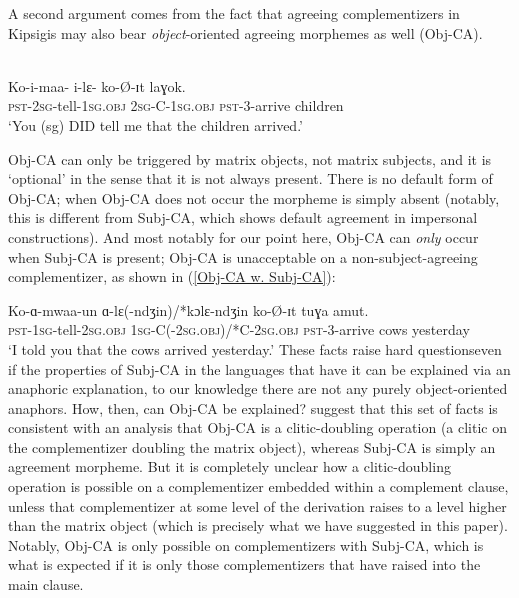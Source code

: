 \documentclass[output=paper
,modfonts
,nonflat
]{langsci/langscibook}
\begin{document}
A second argument comes from the fact that agreeing complementizers in Kipsigis may also bear \textit{object}-oriented agreeing morphemes as well (Obj-CA). 

\ea \label{ObjCAExample} 
\\
\gll Ko-i-maa- i-lɛ- ko-\O-ɪt laɣok. \\
\textsc{pst}-2\textsc{sg}-tell-1\textsc{sg}.\textsc{obj} 2\textsc{sg}-C-1\textsc{sg}.\textsc{obj} \textsc{pst}-3-arrive children \\ 
\glt `You (sg) DID tell me that the children arrived.'
\z

\noindent Obj-CA can only be triggered by matrix objects, not matrix subjects, and it is `optional' in the sense that it is not always present. There is no default form of Obj-CA; when Obj-CA does not occur the morpheme is simply absent (notably, this is different from Subj-CA, which shows default agreement in impersonal constructions). And most notably for our point here, Obj-CA can \textit{only} occur when Subj-CA is present; Obj-CA is unacceptable on a non-subject-agreeing complementizer, as shown in (\ref{Obj-CA w. Subj-CA}): 

\ea \label{Obj-CA w. Subj-CA}
\gll Ko-ɑ-mwaa-un ɑ-lɛ(-ndʒin)/*kɔlɛ-ndʒin ko-\O-ɪt tuɣa amut. \\
\textsc{pst}-1\textsc{sg}-tell-2\textsc{sg}.\textsc{obj} 1\textsc{sg}-C(-2\textsc{sg}.\textsc{obj})/*C-2\textsc{sg}.\textsc{obj} \textsc{pst}-3-arrive cows yesterday \\
\glt `I told you that the cows arrived yesterday.'
\z
\noindent These facts raise hard questions\textemdash even if the properties of Subj-CA in the languages that have it can be explained via an anaphoric explanation, to our knowledge there are not any purely object-oriented anaphors. How, then, can Obj-CA be explained? \citet{DiercksRao:2017} suggest that this set of facts is consistent with an analysis that Obj-CA is a clitic-doubling operation (a clitic on the complementizer doubling the matrix object), whereas Subj-CA is simply an agreement morpheme. But it is completely unclear how a clitic-doubling operation is possible on a complementizer embedded within a complement clause, unless that complementizer at some level of the derivation raises to a level higher than the matrix object (which is precisely what we have suggested in this paper). Notably, Obj-CA is only possible on complementizers with Subj-CA, which is what is expected if it is only those complementizers that have raised into the main clause.  
\end{document}
